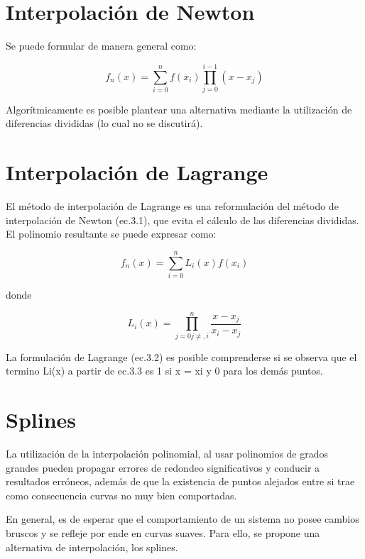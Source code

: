 \documentclass[letterpaper,10pt,oneside]{sphinxmanual}
\theoremstyle{plain}%
\theoremstyle{definition}%
\theoremstyle{remark}%
\begin{document}
\section{Interpolación de Newton}
\label{chapter03:Interpolación de Newton}

Se puede formular de manera general como:

\begin{equation}
	f_n(x) = \sum\limits_{i=0}^{n}f(x_i)\prod\limits_{j=0}^{i-1}(x-x_j)
\end{equation}

Algorítmicamente es posible plantear una alternativa mediante la utilización de
diferencias divididas (lo cual no se discutirá).

\section{Interpolación de Lagrange}
\label{chapter03:Interpolación de Lagrange}

El método de interpolación de Lagrange es una reformulación del método de
interpolación de Newton (ec.3.1), que evita el cálculo de las diferencias divididas.
El polinomio resultante se puede expresar como:

\begin{equation}
	f_n(x)=\sum\limits_{i=0}^{n}L_i(x)f(x_i)
\end{equation}

donde

\begin{equation}
	L_i(x)=\prod\limits_{j=0j \neq,i}^{n}\frac{x-x_j}{x_i-x_j}
\end{equation}

La formulación de Lagrange (ec.3.2) es posible comprenderse si se observa que el
termino Li(x) a partir de ec.3.3 es 1 si x = xi y 0 para los demás puntos.

\section{Splines}
\label{chapter03:Splines}

La utilización de la interpolación polinomial, al usar polinomios de grados
grandes pueden propagar errores de redondeo significativos y conducir a resultados
erróneos, además de que la existencia de puntos alejados entre si trae como
consecuencia curvas no muy bien comportadas.

En general, es de esperar que el comportamiento de un sistema no posee cambios
bruscos y se refleje por ende en curvas suaves. Para ello, se propone una alternativa
de interpolación, los splines.
\end{document}
